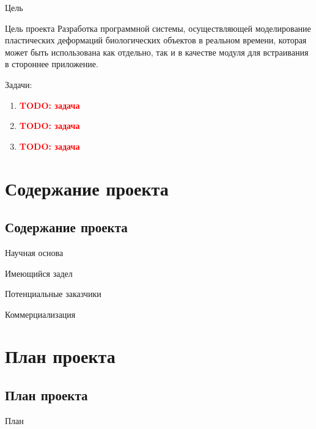 \documentclass[usenames,dvipsnames,pdftex,unicode,hidelinks]{beamer}
\newcommand{\todo}[1]{\textbf{\textcolor{red}{TODO: #1}}}
\begin{document}
  \begin{frame}{Цель}
    \begin{block}{Цель проекта}
      Разработка программной системы, осуществляющей моделирование пластических деформаций
      биологических объектов в реальном времени, которая может быть использована как отдельно, так и
      в качестве модуля для встраивания в стороннее приложение.
    \end{block}
    Задачи:
    \begin{enumerate}
      \item \todo{задача}
      \item \todo{задача}
      \item \todo{задача}
    \end{enumerate}
  \end{frame}

  \section{Содержание проекта}
  \subsection{Содержание проекта}
  \begin{frame}{Научная основа}

  \end{frame}

  \begin{frame}{Имеющийся задел}

  \end{frame}

  \begin{frame}{Потенциальные заказчики}

  \end{frame}

  \begin{frame}{Коммерциализация}

  \end{frame}

  \section{План проекта}
  \subsection{План проекта}
  \begin{frame}{План}

  \end{frame}
\end{document}
